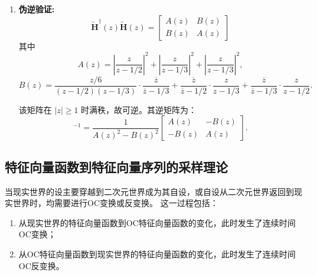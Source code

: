 \begin{example}[离散时间OC变换综合题]
\begin{enumerate}
        \item \textbf{伪逆验证:}
              \begin{equation}
                  \tilde{\mathbf{H}}^\dagger(z)\tilde{\mathbf{H}}(z) = \begin{bmatrix}
                      A(z) & B(z) \\ B(z) & A(z)
                  \end{bmatrix}
              \end{equation}
              其中
              \begin{equation}
                  A(z) = \left|\dfrac{z}{z-1/2}\right|^2 + \left|\dfrac{z}{z-1/3}\right|^2 + \left|\dfrac{z}{z-1/3}\right|^2,
              \end{equation}
              \begin{equation}
                  B(z) = \dfrac{z/6}{(z-1/2)(z-1/3)}\cdot\dfrac{\overline{z}}{\overline{z}-1/3} + \dfrac{\overline{z}}{\overline{z}-1/2}\cdot\dfrac{z}{z-1/3} + \dfrac{\overline{z}}{\overline{z}-1/3}\cdot\dfrac{z}{z-1/2}.
              \end{equation}

              该矩阵在 $|z|\geq 1$ 时满秩，故可逆。其逆矩阵为：
              \begin{equation}
                  [\tilde{\mathbf{H}}^\dagger(z)\tilde{\mathbf{H}}(z)]^{-1} = \dfrac{1}{A(z)^2 - B(z)^2} \begin{bmatrix}
                      A(z) & -B(z) \\ -B(z) & A(z)
                  \end{bmatrix}.
              \end{equation}
    \end{enumerate}
\end{example}

\subsection{特征向量函数到特征向量序列的采样理论}
\label{subsec:sampling-theory}

当现实世界的设主要穿越到二次元世界成为其自设，或自设从二次元世界返回到现实世界时，均需要进行OC变换或反变换。
这一过程包括：
\begin{enumerate}
    \item 从现实世界的特征向量函数到OC特征向量函数的变化，此时发生了连续时间OC变换；
    \item 从OC特征向量函数到现实世界的特征向量函数的变化，此时发生了连续时间OC反变换。
\end{enumerate}

